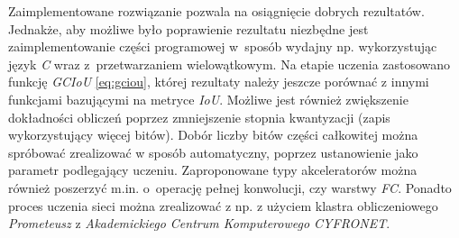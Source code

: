 Zaimplementowane rozwiązanie pozwala na osiągnięcie dobrych rezultatów. 
Jednakże, aby możliwe było poprawienie rezultatu niezbędne jest zaimplementowanie części programowej w~sposób wydajny np. wykorzystując język \emph{C} wraz z~przetwarzaniem wielowątkowym.
Na etapie uczenia zastosowano funkcję \emph{GCIoU} \eqref{eq:gciou}, której rezultaty należy jeszcze porównać z innymi funkcjami bazującymi na metryce \emph{IoU}.
Możliwe jest również zwiększenie dokładności obliczeń poprzez zmniejszenie stopnia kwantyzacji (zapis wykorzystujący więcej bitów).
Dobór liczby bitów części całkowitej można spróbować zrealizować w sposób automatyczny, poprzez ustanowienie jako parametr podlegający uczeniu.
Zaproponowane typy akceleratorów można również poszerzyć m.in. o~operację pełnej konwolucji, czy warstwy \emph{FC}.
Ponadto proces uczenia sieci można zrealizować z np. z użyciem klastra obliczeniowego \emph{Prometeusz} z \emph{Akademickiego Centrum
Komputerowego CYFRONET}.
